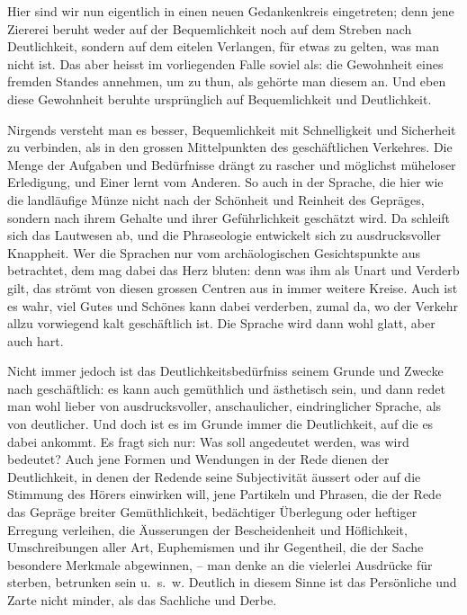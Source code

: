 {Hier sind wir nun eigentlich in einen neuen Gedankenkreis eingetreten; denn jene Ziererei beruht weder auf der Bequemlichkeit noch auf dem Streben nach Deutlichkeit, sondern auf dem eitelen Verlangen, für etwas zu gelten, was man nicht ist. Das aber heisst im vorliegenden Falle soviel als: die Gewohnheit eines fremden Standes annehmen, um zu thun, als gehörte man diesem an. Und eben diese Gewohnheit beruhte ursprünglich auf Bequemlichkeit und Deutlichkeit.

Nirgends versteht man es besser, Bequemlichkeit mit Schnelligkeit und Sicherheit zu verbinden, als in den grossen Mittelpunkten des geschäftlichen Verkehres. Die Menge der Aufgaben und Bedürfnisse drängt zu rascher und möglichst müheloser Erledigung, und Einer lernt vom Anderen. So auch in der Sprache, die hier wie die landläufige Münze nicht nach der Schönheit und Reinheit des Gepräges, sondern nach ihrem Gehalte und ihrer Geführlichkeit geschätzt wird. Da schleift sich das Lautwesen ab, und die Phraseologie entwickelt sich zu ausdrucksvoller Knappheit. Wer die Sprachen nur vom archäologischen Gesichtspunkte aus betrachtet, dem mag dabei das Herz bluten: denn was ihm als Unart und Verderb gilt, das strömt von diesen grossen Centren aus in \label{fp.195} immer weitere Kreise. Auch ist es wahr, viel Gutes und Schönes kann dabei verderben, zumal da, wo der Verkehr allzu vorwiegend kalt geschäftlich ist. Die Sprache wird dann wohl glatt, aber auch hart.

Nicht immer jedoch ist das Deutlichkeitsbedürfniss seinem Grunde und Zwecke nach geschäftlich: es kann auch gemüthlich und ästhetisch sein, und dann redet man wohl lieber von ausdrucksvoller, anschaulicher, eindringlicher \label{sp.185} Sprache, als von deutlicher. Und doch ist es im Grunde immer die Deutlichkeit, auf die es dabei ankommt. Es fragt sich nur: Was soll angedeutet werden, was wird bedeutet? Auch jene Formen und Wendungen in der Rede dienen der Deutlichkeit, in denen der Redende seine Subjectivität äussert oder auf die Stimmung des Hörers einwirken will, jene Partikeln und Phrasen, die der Rede das Gepräge breiter Gemüthlichkeit, bedächtiger Überlegung oder heftiger Erregung verleihen, die Äusserungen der Bescheidenheit und Höflichkeit, Umschreibungen aller Art, Euphemismen und ihr Gegentheil, die der Sache besondere Merkmale abgewinnen, – man denke an die vielerlei Ausdrücke für sterben, betrunken sein u.~s.~w. Deutlich in diesem Sinne ist das Persönliche und Zarte nicht minder, als das Sachliche und Derbe.

}

